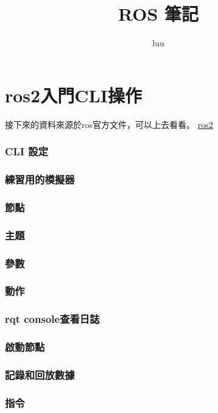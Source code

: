 \documentclass{article}
\title{ROS 筆記}
\author{luu}
\date{} %
\begin{document}
\maketitle
\tableofcontents


\clearpage
\part{ros2入門CLI操作}
接下來的資料來源於ros官方文件，可以上去看看。
\href{https://docs.ros.org/en/humble/Installation.html}{ros2}
\section{CLI 設定}

\section{練習用的模擬器}

\section{節點}

\section{主題}

\section{參數}

\section{動作}

\section{rqt console查看日誌}

\section{啟動節點}

\section{記錄和回放數據}

\section{指令}

\end{document}
